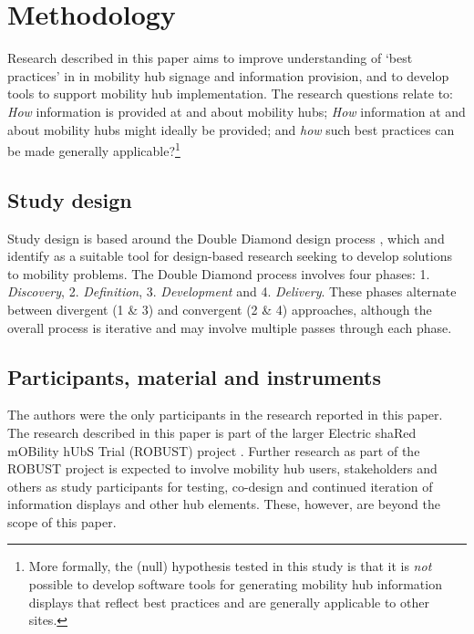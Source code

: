 \documentclass[preprint, 3p,
authoryear]{elsarticle} %
\begin{document}
\section{Methodology}\label{methodology}

Research described in this paper aims to improve understanding of `best
practices' in in mobility hub signage and information provision, and to
develop tools to support mobility hub implementation. The research
questions relate to: \emph{How} information is provided at and about
mobility hubs; \emph{How} information at and about mobility hubs might
ideally be provided; and \emph{how} such best practices can be made
generally applicable?\footnote{More formally, the (null) hypothesis
  tested in this study is that it is \emph{not} possible to develop
  software tools for generating mobility hub information displays that
  reflect best practices and are generally applicable to other sites.}

\subsection{Study design}\label{study-design}

Study design is based around the Double Diamond design process
\citep{UK-Design-Council:0aa}, which \citet{Coxon:2018aa} and
\citet{Coxon:2021ab} identify as a suitable tool for design-based
research seeking to develop solutions to mobility problems. The Double
Diamond process involves four phases: 1. \emph{Discovery}, 2.
\emph{Definition}, 3. \emph{Development} and 4. \emph{Delivery}. These
phases alternate between divergent (1 \& 3) and convergent (2 \& 4)
approaches, although the overall process is iterative and may involve
multiple passes through each phase.

\subsection{Participants, material and
instruments}\label{participants-material-and-instruments}

The authors were the only participants in the research reported in this
paper. The research described in this paper is part of the larger
Electric shaRed mOBility hUbS Trial (ROBUST) project
\citep{ROBUST:2025aa}. Further research as part of the ROBUST project is
expected to involve mobility hub users, stakeholders and others as study
participants for testing, co-design and continued iteration of
information displays and other hub elements. These, however, are beyond
the scope of this paper.
\end{document}
